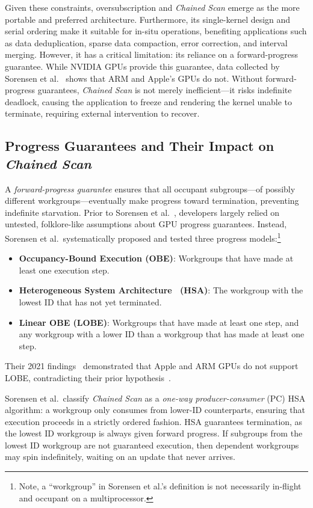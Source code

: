 \documentclass[acmsmall, manuscript, screen, review, anonymous]{acmart}
\begin{document}
Given these constraints, oversubscription and \emph{Chained Scan} emerge as the more portable and preferred architecture. Furthermore, its single-kernel design and serial ordering make it suitable for in-situ operations, benefiting applications such as data deduplication, sparse data compaction, error correction, and interval merging. However, it has a critical limitation: its reliance on a forward-progress guarantee. While NVIDIA GPUs provide this guarantee, data collected by Sorensen et al.~\cite{sorensen2021} shows that ARM and Apple's GPUs do not. Without forward-progress guarantees, \emph{Chained Scan} is not merely inefficient---it risks indefinite deadlock, causing the application to freeze and rendering the kernel unable to terminate, requiring external intervention to recover.

\subsection{Progress Guarantees and Their Impact on \emph{Chained Scan}}
A \emph{forward-progress guarantee} ensures that all occupant subgroups---of possibly different workgroups---eventually make progress toward termination, preventing indefinite starvation. Prior to Sorensen et al.~\cite{sorensen2018,sorensen2021}, developers largely relied on untested, folklore-like assumptions about GPU progress guarantees. Instead, Sorensen et al.\ systematically proposed and tested three progress models:\footnote{Note, a ``workgroup'' in Sorensen et al.'s definition is not necessarily in-flight and occupant on a multiprocessor.}
\begin{itemize}
  \item \textbf{Occupancy-Bound Execution (OBE)}: Workgroups that have made at least one execution step.
  \item \textbf{Heterogeneous System Architecture~\cite[Section~2.11]{HSASysArch12} (HSA)}: The workgroup with the lowest ID that has not yet terminated.
  \item \textbf{Linear OBE (LOBE)}: Workgroups that have made at least one step, and any workgroup with a lower ID than a workgroup that has made at least one step.
\end{itemize}
Their 2021 findings~\cite{sorensen2021} demonstrated that Apple and ARM GPUs do not support LOBE, contradicting their prior hypothesis~\cite{sorensen2018}.

Sorensen et al.\ classify \emph{Chained Scan} as a \emph{one-way producer-consumer} (PC) HSA algorithm: a workgroup only consumes from lower-ID counterparts, ensuring that execution proceeds in a strictly ordered fashion. HSA guarantees termination, as the lowest ID workgroup is always given forward progress. If subgroups from the lowest ID workgroup are not guaranteed execution, then dependent workgroups may spin indefinitely, waiting on an update that never arrives.
\end{document}

